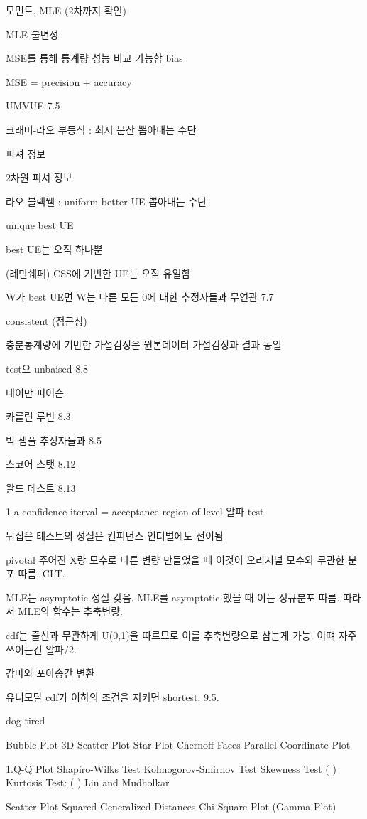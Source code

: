 \documentclass[
]{book}
\begin{document}
{{{모먼트, MLE (2차까지 확인)

MLE 불변성

MSE를 통해 통계량 성능 비교 가능함
bias

MSE = precision + accuracy

UMVUE 7.5

크래머-라오 부등식 : 최저 분산 뽑아내는 수단

피셔 정보

2차원 피셔 정보

라오-블랙웰 : uniform better UE 뽑아내는 수단

unique best UE

best UE는 오직 하나뿐

(레만쉐페) CSS에 기반한 UE는 오직 유일함

W가 best UE면 W는 다른 모든 0에 대한 추정자들과 무연관 7.7

consistent (점근성)

충분통계량에 기반한 가설검정은 원본데이터 가설검정과 결과 동일

test으 unbaised 8.8

네이만 피어슨

카를린 루빈 8.3

빅 샘플 추정자들과 8.5

스코어 스탯 8.12

왈드 테스트 8.13

1-a confidence iterval = acceptance region of level 알파 test

뒤집은 테스트의 성질은 컨피던스 인터벌에도 전이됨

pivotal 주어진 X랑 모수로 다른 변량 만들었을 때 이것이 오리지널 모수와 무관한 분포 따름. CLT.

MLE는 asymptotic 성질 갖음. MLE를 asymptotic 했을 때 이는 정규분포 따름. 따라서 MLE의 함수는 추축변량.

cdf는 출신과 무관하게 U(0,1)을 따르므로 이를 추축변량으로 삼는게 가능. 이떄 자주 쓰이는건 알파/2.

감마와 포아송간 변환

유니모달 cdf가 이하의 조건을 지키면 shortest. 9.5.

dog-tired

Bubble Plot
3D Scatter Plot
Star Plot
Chernoff Faces
Parallel Coordinate Plot

1.Q-Q Plot
Shapiro-Wilks Test
Kolmogorov-Smirnov Test
Skewness Test ( )
Kurtosis Test: ( )
Lin and Mudholkar

Scatter Plot
Squared Generalized Distances
Chi-Square Plot (Gamma Plot)

}}}
\end{document}
